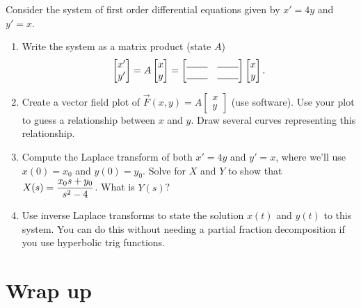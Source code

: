 \begin{problem}
Consider the system of first order differential equations given by $x'=4y$ and $y'=x$.
\begin{enumerate}
 \item Write the system as a matrix product (state $A$) 
$$\begin{bmatrix}x'\\y'\end{bmatrix}
=A\begin{bmatrix}x\\y\end{bmatrix}
=\begin{bmatrix}\rule{.3in}{.5pt}&\rule{.3in}{.5pt}\\\rule{.3in}{.5pt}&\rule{.3in}{.5pt}\end{bmatrix}\begin{bmatrix}x\\y\end{bmatrix}.$$
 \item Create a vector field plot of $\vec F(x,y) = A\begin{bmatrix}x\\y\end{bmatrix}$ (use software). Use your plot to guess a relationship between $x$ and $y$. Draw several curves representing this relationship.
 \item Compute the Laplace transform of both $x'=4y$ and $y'=x$, where we'll use $x(0)=x_0$ and $y(0)=y_0$. Solve for $X$ and $Y$ to show that $\displaystyle X(s) = \frac{x_0s+y_0}{s^2-4}$. What is $Y(s)$?
 \item Use inverse Laplace transforms to state the solution $x(t)$ and $y(t)$ to this system. You can do this without needing a partial fraction decomposition if you use hyperbolic trig functions.
\end{enumerate}

\end{problem}





\section*{Wrap up}

